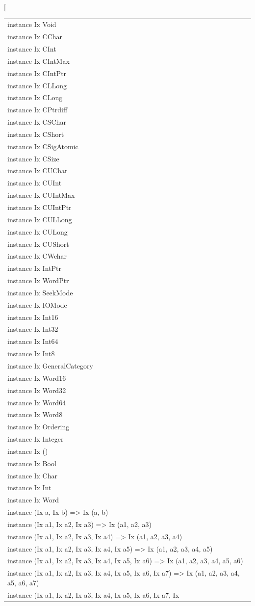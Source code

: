 \begin{haddockdesc}
\item[\begin{tabular}{@{}l}
instance Ix Void\\instance Ix CChar\\instance Ix CInt\\instance Ix CIntMax\\instance Ix CIntPtr\\instance Ix CLLong\\instance Ix CLong\\instance Ix CPtrdiff\\instance Ix CSChar\\instance Ix CShort\\instance Ix CSigAtomic\\instance Ix CSize\\instance Ix CUChar\\instance Ix CUInt\\instance Ix CUIntMax\\instance Ix CUIntPtr\\instance Ix CULLong\\instance Ix CULong\\instance Ix CUShort\\instance Ix CWchar\\instance Ix IntPtr\\instance Ix WordPtr\\instance Ix SeekMode\\instance Ix IOMode\\instance Ix Int16\\instance Ix Int32\\instance Ix Int64\\instance Ix Int8\\instance Ix GeneralCategory\\instance Ix Word16\\instance Ix Word32\\instance Ix Word64\\instance Ix Word8\\instance Ix Ordering\\instance Ix Integer\\instance Ix ()\\instance Ix Bool\\instance Ix Char\\instance Ix Int\\instance Ix Word\\instance (Ix a, Ix b) => Ix (a, b)\\instance (Ix a1, Ix a2, Ix a3) => Ix (a1, a2, a3)\\instance (Ix a1, Ix a2, Ix a3, Ix a4) => Ix (a1, a2, a3, a4)\\instance (Ix a1, Ix a2, Ix a3, Ix a4, Ix a5) => Ix (a1, a2, a3, a4, a5)\\instance (Ix a1, Ix a2, Ix a3, Ix a4, Ix a5, Ix a6) => Ix (a1, a2, a3, a4, a5, a6)\\instance (Ix a1, Ix a2, Ix a3, Ix a4, Ix a5, Ix a6, Ix a7) => Ix (a1, a2, a3, a4, a5, a6, a7)\\instance (Ix a1, Ix a2, Ix a3, Ix a4, Ix a5, Ix a6, Ix a7, Ix 
\end{tabular}
\end{haddockdesc}
